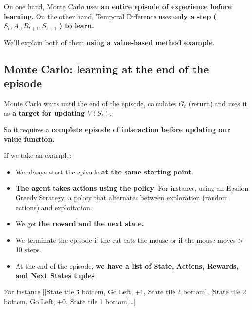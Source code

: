 \documentclass[11pt,a4paper]{article}
\begin{document}
On one hand, Monte Carlo uses \textbf{an entire episode of experience before learning.} On the other hand, Temporal Difference uses \textbf{only a step ( \(S_t, A_t, R_{t+1}, S_{t+1}\) ) to learn.}

We'll explain both of them \textbf{using a value-based method example.}

\subsection{Monte Carlo: learning at the end of the episode}\label{monte-carlo-learning-at-the-end-of-the-episode}

Monte Carlo waits until the end of the episode, calculates \(G_t\) (return) and uses it as \textbf{a target for updating \(V(S_t)\).}

So it requires a \textbf{complete episode of interaction before updating our value function.}


If we take an example:


\begin{itemize}
\item
  We always start the episode \textbf{at the same starting point.}
\item
  \textbf{The agent takes actions using the policy}. For instance, using an Epsilon Greedy Strategy, a policy that alternates between exploration (random actions) and exploitation.
\item
  We get \textbf{the reward and the next state.}
\item
  We terminate the episode if the cat eats the mouse or if the mouse moves \textgreater{} 10 steps.
\item
  At the end of the episode, \textbf{we have a list of State, Actions, Rewards, and Next States tuples}
\end{itemize}

For instance {[}{[}State tile 3 bottom, Go Left, +1, State tile 2 bottom{]}, {[}State tile 2 bottom, Go Left, +0, State tile 1 bottom{]}\ldots{]}
\end{document}

